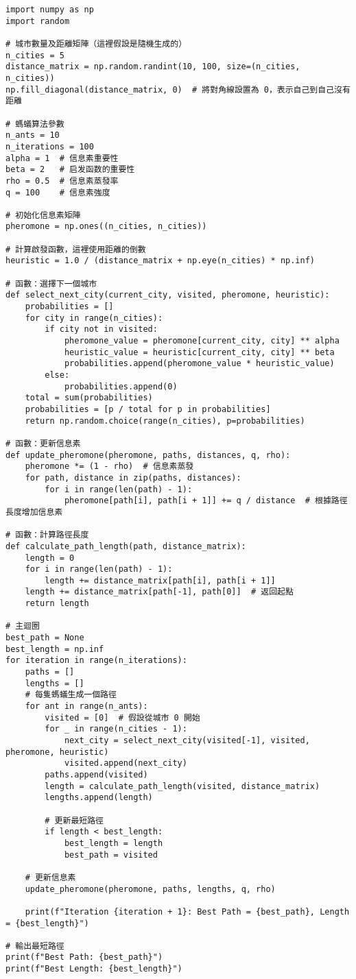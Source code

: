\begin{verbatim}
import numpy as np
import random

# 城市數量及距離矩陣（這裡假設是隨機生成的）
n_cities = 5
distance_matrix = np.random.randint(10, 100, size=(n_cities, n_cities))
np.fill_diagonal(distance_matrix, 0)  # 將對角線設置為 0，表示自己到自己沒有距離

# 螞蟻算法參數
n_ants = 10
n_iterations = 100
alpha = 1  # 信息素重要性
beta = 2   # 启发函数的重要性
rho = 0.5  # 信息素蒸發率
q = 100    # 信息素強度

# 初始化信息素矩陣
pheromone = np.ones((n_cities, n_cities))

# 計算啟發函數，這裡使用距離的倒數
heuristic = 1.0 / (distance_matrix + np.eye(n_cities) * np.inf)

# 函數：選擇下一個城市
def select_next_city(current_city, visited, pheromone, heuristic):
    probabilities = []
    for city in range(n_cities):
        if city not in visited:
            pheromone_value = pheromone[current_city, city] ** alpha
            heuristic_value = heuristic[current_city, city] ** beta
            probabilities.append(pheromone_value * heuristic_value)
        else:
            probabilities.append(0)
    total = sum(probabilities)
    probabilities = [p / total for p in probabilities]
    return np.random.choice(range(n_cities), p=probabilities)

# 函數：更新信息素
def update_pheromone(pheromone, paths, distances, q, rho):
    pheromone *= (1 - rho)  # 信息素蒸發
    for path, distance in zip(paths, distances):
        for i in range(len(path) - 1):
            pheromone[path[i], path[i + 1]] += q / distance  # 根據路徑長度增加信息素

# 函數：計算路徑長度
def calculate_path_length(path, distance_matrix):
    length = 0
    for i in range(len(path) - 1):
        length += distance_matrix[path[i], path[i + 1]]
    length += distance_matrix[path[-1], path[0]]  # 返回起點
    return length

# 主迴圈
best_path = None
best_length = np.inf
for iteration in range(n_iterations):
    paths = []
    lengths = []
    # 每隻螞蟻生成一個路徑
    for ant in range(n_ants):
        visited = [0]  # 假設從城市 0 開始
        for _ in range(n_cities - 1):
            next_city = select_next_city(visited[-1], visited, pheromone, heuristic)
            visited.append(next_city)
        paths.append(visited)
        length = calculate_path_length(visited, distance_matrix)
        lengths.append(length)
        
        # 更新最短路徑
        if length < best_length:
            best_length = length
            best_path = visited

    # 更新信息素
    update_pheromone(pheromone, paths, lengths, q, rho)

    print(f"Iteration {iteration + 1}: Best Path = {best_path}, Length = {best_length}")

# 輸出最短路徑
print(f"Best Path: {best_path}")
print(f"Best Length: {best_length}")
\end{verbatim}